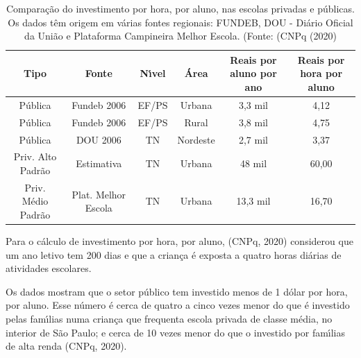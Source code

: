 \documentclass[
12pt,		%
openright,	%
twoside,  %
a4paper,			%
chapter=TITLE,		%
english,			%
french,				%
spanish,			%
brazil				%
]{USPSC-classe/USPSC}
\begin{document}
\begin{table}[htb]
\tiny
\caption{\label{489af209007e651b007535a7733d5ca117c5b310}Compara\c{c}\~ao do investimento por hora, por aluno, nas escolas privadas e p\'ublicas. Os dados t\^em origem em v\'arias fontes regionais: FUNDEB, DOU - Di\'ario Oficial da Uni\~ao e Plataforma Campineira Melhor Escola. (Fonte: (CNPq (2020)}

\centering
\begin{tabular}{|c|c|c|c|c|c|}
\hline
Tipo  &  Fonte  &  N\'{\i}vel  &  \'Area  &  Reais por aluno por ano  &  Reais por hora por aluno \\
\hline
P\'ublica  &  Fundeb 2006  &  EF/PS  &  Urbana  &  3,3 mil  &  4,12 \\
P\'ublica  &  Fundeb 2006  &  EF/PS  &  Rural  &  3,8 mil  &  4,75 \\
P\'ublica  &  DOU 2006  &  TN  &  Nordeste  &  2,7 mil  &  3,37 \\
Priv. Alto Padr\~ao  &  Estimativa  &  TN  &  Urbana  &  48 mil  &  60,00 \\
Priv. M\'edio Padr\~ao  &  Plat. Melhor Escola  &  TN  &  Urbana  &  13,3 mil  &  16,70 \\
\hline
\end{tabular}
\end{table}


Para o c\'alculo de investimento por hora, por aluno, (CNPq, 2020) considerou que um ano letivo tem 200 dias e que a crian\c{c}a \'e exposta a quatro horas di\'arias de atividades escolares.

















Os dados mostram que o setor p\'ublico tem investido menos de 1 d\'olar por hora, por aluno. Esse n\'umero \'e cerca de quatro a cinco vezes menor do que \'e investido pelas fam\'{\i}lias numa crian\c{c}a que frequenta escola privada de classe m\'edia, no interior de S\~ao Paulo; e cerca de 10 vezes menor do que o investido por fam\'{\i}lias de alta renda (CNPq, 2020).
\end{document}
